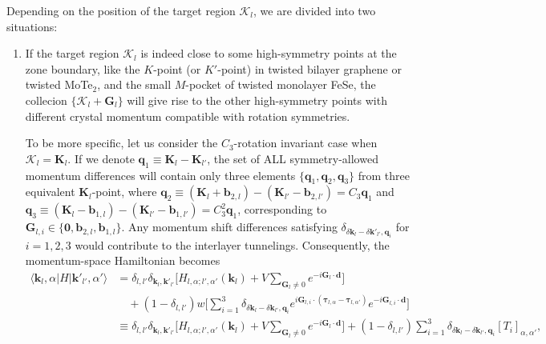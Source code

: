 Depending on the position of the target region $\bm{\mathcal K}_l$, we are divided into two situations:
\begin{enumerate}
    \item If the target region $\bm{\mathcal K}_l$ is indeed close to some high-symmetry points at the zone boundary, like the $K$-point (or $K'$-point) in twisted bilayer graphene or twisted MoTe$_2$, and the small $M$-pocket of twisted monolayer FeSe, the collecion $\{\bm{\mathcal K}_l+\bm G_l\}$ will give rise to the other high-symmetry points with different crystal momentum compatible with rotation symmetries.

          To be more specific, let us consider the $C_3$-rotation invariant case when $\bm{\mathcal K}_l=\bm K_l$. If we denote $\bm q_1\equiv\bm K_l-\bm K_{l'}$, the set of ALL symmetry-allowed momentum differences will contain only three elements $\{\bm q_1,\bm q_2,\bm q_3\}$ from three equivalent $\bm K_l$-point, where $\bm q_2\equiv(\bm K_l+\bm b_{2,l})-(\bm K_{l'}-\bm b_{2,l'})=C_3\bm q_1$ and $\bm q_3\equiv(\bm K_l-\bm b_{1,l})-(\bm K_{l'}-\bm b_{1,l'})=C_3^2\bm q_1$, corresponding to $\bm G_{l,i}\in\{\bm 0,\bm b_{2,l},\bm b_{1,l}\}$. Any momentum shift differences satisfying $\delta_{\delta\bm k_l-\delta\bm k'_{l'},\bm q_i}$ for $i=1,2,3$ would contribute to the interlayer tunnelings. Consequently, the momentum-space Hamiltonian becomes
          \begin{align}
              \langle \bm k_l,\alpha|H|\bm k'_{l'},\alpha'\rangle & = \delta_{l,l'}\delta_{\bm k_l,\bm k'_{l'}}\bigg[H_{l,\alpha;l',\alpha'}(\bm k_l) + V\sum_{\bm G_l\neq0}e^{-i\bm G_l\cdot\bm d}\bigg]\nonumber                                                                                                                                                              \\
                                                                  & \quad +(1-\delta_{l,l'}) w\bigg[\sum_{i=1}^3 \delta_{\delta\bm k_l-\delta\bm k_{l'},\bm q_i}e^{i\bm G_{l,i}\cdot(\bm\tau_{l,\alpha}-\bm\tau_{l,\alpha'})}e^{-i\bm G_{l,i}\cdot\bm d}\bigg]\nonumber                                                                                                         \\
                                                                  & \equiv\delta_{l,l'}\delta_{\bm k_l,\bm k'_{l'}}\bigg[H_{l,\alpha;l',\alpha'}(\bm k_l) + V\sum_{\bm G_l\neq0}e^{-i\bm G_l\cdot\bm d}\bigg] + (1-\delta_{l,l'}) \sum_{i=1}^3 \delta_{\delta\bm k_l-\delta\bm k_{l'},\bm q_i}[T_i]_{\alpha,\alpha'},\label{eq:two-center_approximation_at_high_symmetry_point}

\end{align}
\end{enumerate}
